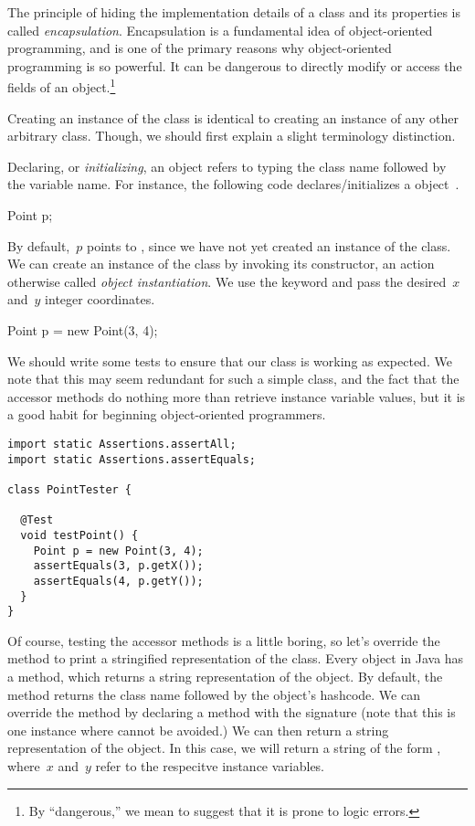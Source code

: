 The principle of hiding the implementation details of a class and its properties is called \emph{encapsulation}. 
Encapsulation is a fundamental idea of object-oriented programming, and is one of the primary reasons why object-oriented programming is so powerful. 
It can be dangerous to directly modify or access the fields of an object.\footnote{By ``dangerous,'' we mean to suggest that it is prone to logic errors.} 

Creating an instance of the  class is identical to creating an instance of any other arbitrary class.
Though, we should first explain a slight terminology distinction.

Declaring, or \emph{initializing}, an object refers to typing the class name followed by the variable name. 
For instance, the following code declares/initializes a  object~.

\begin{verbnobox}[\small]
Point p;
\end{verbnobox}

By default,~$p$ points to , since we have not yet created an instance of the  class. 
We can create an instance of the  class by invoking its constructor, an action otherwise called \emph{object instantiation}. 
We use the  keyword and pass the desired~$x$ and~$y$ integer coordinates. 

\begin{verbnobox}[\small]
Point p = new Point(3, 4);
\end{verbnobox}

We should write some tests to ensure that our  class is working as expected. 
We note that this may seem redundant for such a simple class, and the fact that the accessor methods do nothing more than retrieve instance variable values, but it is a good habit for beginning object-oriented programmers.

\begin{lstlisting}[language=MyJava]
import static Assertions.assertAll;
import static Assertions.assertEquals;

class PointTester {
  
  @Test
  void testPoint() {
    Point p = new Point(3, 4);
    assertEquals(3, p.getX());
    assertEquals(4, p.getY());
  }
}
\end{lstlisting}

Of course, testing the accessor methods is a little boring, so let's override the  method to print a stringified representation of the  class. 
Every object in Java has a  method, which returns a string representation of the object. 
By default, the  method returns the class name followed by the object's hashcode. 
We can override the  method by declaring a method with the signature  (note that this is one instance where  cannot be avoided.) 
We can then return a string representation of the object. 
In this case, we will return a string of the form , where~$x$ and~$y$ refer to the respecitve instance variables. 

